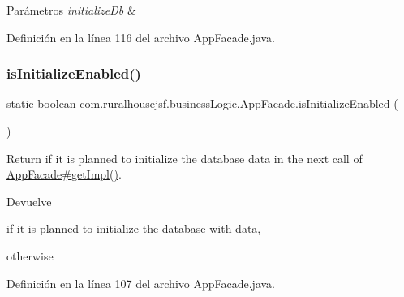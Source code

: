 \begin{DoxyParams}{Parámetros}
{\em initialize\+Db} & \\
\hline
\end{DoxyParams}


Definición en la línea 116 del archivo App\+Facade.\+java.

\mbox{\label{a00128_a0486115e3ba238d025e23ec62548b3bc}} 
\subsubsection{\texorpdfstring{isInitializeEnabled()}{isInitializeEnabled()}}
{\footnotesize\ttfamily static boolean com.\+ruralhousejsf.\+business\+Logic.\+App\+Facade.\+is\+Initialize\+Enabled (\begin{DoxyParamCaption}{ }\end{DoxyParamCaption})\hspace{0.3cm}{\ttfamily [static]}}



Return if it is planned to initialize the database data in the next call of \mbox{\hyperlink{a00128_a029bcceee98b9070b9f80abc54db45d6}{App\+Facade\#get\+Impl()}}. 

\begin{DoxyReturn}{Devuelve}

\begin{DoxyCode}{0}
\DoxyCodeLine{\textcolor{keyword}{true} }
\end{DoxyCode}
 if it is planned to initialize the database with data,
\begin{DoxyCode}{0}
\DoxyCodeLine{\textcolor{keyword}{false} }
\end{DoxyCode}
 otherwise 
\end{DoxyReturn}


Definición en la línea 107 del archivo App\+Facade.\+java.

\mbox{\label{a00128_a3638d881ea2d917df632a313d9ed9b20}} 
